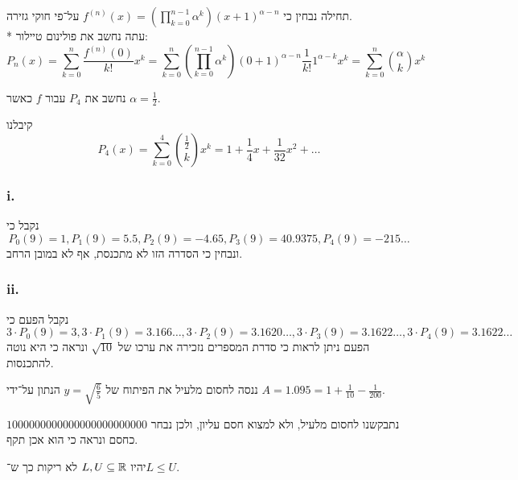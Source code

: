 תחילה נבחין כי $f^{(n)}(x) = (\prod_{k = 0}^{n - 1} \alpha^k) {(x + 1)}^{\alpha - n}$ על־פי חוקי גזירה. \\*
עתה נחשב את פולינום טיילור:
\[
	P_n(x) = \sum_{k = 0}^{n} \frac{f^{(n)}(0)}{k!} x^k
	= \sum_{k = 0}^{n} (\prod_{k = 0}^{n - 1} \alpha^k) {(0 + 1)}^{\alpha - n} \frac{1}{k!} 1^{\alpha - k} x^k
	= \sum_{k = 0}^{n} \binom{\alpha}{k} x^k
\]

\Subquestion{}
נחשב את $P_4$ עבור $f$ כאשר $\alpha = \frac{1}{2}$.

קיבלנו
\[
	P_4(x) = \sum_{k = 0}^{4} \binom{\frac{1}{2}}{k} x^k
	= 1 + \frac{1}{4} x + \frac{1}{32} x^2 + \dots
\]

\Subquestion{}
\subsubsection{i.}
נקבל כי
\[
	P_0(9) = 1,
	P_1(9) = 5.5,
	P_2(9) = -4.65,
	P_3(9) = 40.9375,
	P_4(9) = -215\dots
\]
ונבחין כי הסדרה הזו לא מתכנסת, אף לא במובן הרחב.

\subsubsection{ii.}
נקבל הפעם כי
\[
	3 \cdot P_0(9) = 3,
	3 \cdot P_1(9) = 3.166\dots,
	3 \cdot P_2(9) = 3.1620\dots,
	3 \cdot P_3(9) = 3.1622\dots,
	3 \cdot P_4(9) = 3.1622\dots
\]
הפעם ניתן לראות כי סדרת המספרים נזכירה את ערכו של $\sqrt{10}$ ונראה כי היא נוטה להתכנסות.

\Subquestion{}
ננסה לחסום מלעיל את הפיתוח של $y = \sqrt{\frac{6}{5}}$ הנתון על־ידי $A = 1.095 = 1 + \frac{1}{10} - \frac{1}{200}$.

נתבקשנו לחסום מלעיל, ולא למצוא חסם עליון, ולכן נבחר $1000000000000000000000000$ כחסם ונראה כי הוא אכן תקף.

\Question{}
יהיו $L, U \subseteq \mathbb{R}$ לא ריקות כך ש־$L \le U$.

